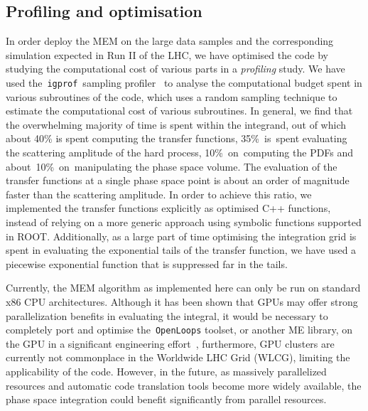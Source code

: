 \subsection{Profiling and optimisation}
\label{sec:mem_optimisation}

In order deploy the MEM on the large data samples and the corresponding simulation expected in Run II of the LHC, we have optimised the code by studying the computational cost of various parts in a \textit{profiling} study. We have used the~\texttt{igprof}~sampling profiler~\cite{Eulisse:2005zz,Tuura:2008zza} to analyse the computational budget spent in various subroutines of the code, which uses a random sampling technique to estimate the computational cost of various subroutines. In general, we find    
that the overwhelming majority of time is spent within the integrand, out of which about 40\% is spent computing the transfer functions, 35\%~is~spent evaluating the scattering amplitude of the hard process, 10\%~on~computing the PDFs and about~10\%~on~manipulating the phase space volume. The evaluation of the transfer functions at a single phase space point is about an order of magnitude faster than the scattering amplitude. In order to achieve this ratio, we implemented the transfer functions explicitly as optimised C++ functions, instead of relying on a more generic approach using symbolic functions supported in ROOT. Additionally, as a large part of time optimising the integration grid is spent in evaluating the exponential tails of the transfer function, we have used a piecewise exponential function that is suppressed far in the tails.

Currently, the MEM algorithm as implemented here can only be run on standard x86 CPU architectures. Although it has been shown that GPUs may offer strong parallelization benefits in evaluating the integral, it would be necessary to completely port and optimise the~\texttt{OpenLoops} toolset, or another ME library, on the GPU in a significant engineering effort~\cite{Schouten:2014yza}, furthermore, GPU clusters are currently not commonplace in the Worldwide LHC Grid (WLCG), limiting the applicability of the code. However, in the future, as massively parallelized resources and automatic code translation tools become more widely available, the phase space integration could benefit significantly from parallel resources.

